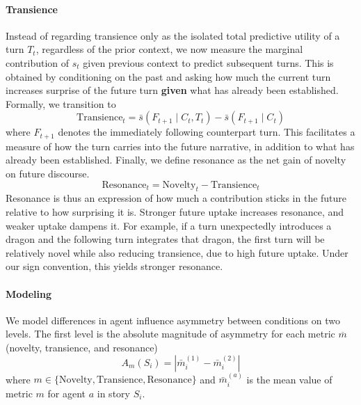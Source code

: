 \documentclass[11pt]{article}
\begin{document}
\paragraph{Transience}
Instead of regarding transience only as the isolated total predictive utility of a turn $T_t$, regardless of the prior context, we now measure the marginal contribution of $s_t$ given previous context to predict subsequent turns. This is obtained by conditioning on the past and asking how much the current turn increases surprise of the future turn \textbf{given} what has already been established. Formally, we transition to
\begin{equation}
\mathrm{Transience}_t
=
\bar{s}(F_{t+1} \mid C_t, T_t)
-
\bar{s}(F_{t+1} \mid C_t)
\end{equation}
where $F_{t+1}$ denotes the immediately following counterpart turn. This facilitates a measure of how the turn carries into the future narrative, in addition to what has already been established. 
Finally, we define resonance as the net gain of novelty on future discourse.
\begin{equation}
\mathrm{Resonance}_t = \mathrm{Novelty}_t - \mathrm{Transience}_t
\end{equation}
Resonance is thus an expression of how much a contribution sticks in the future relative to how surprising it is. Stronger future uptake increases resonance, and weaker uptake dampens it.
For example, if a turn unexpectedly introduces a dragon and the following turn integrates that dragon, the first turn will be relatively novel while also reducing transience, due to high future uptake. Under our sign convention, this yields stronger resonance.

\paragraph{Modeling}
We model differences in agent influence asymmetry between conditions on two levels. The first level is the absolute magnitude of asymmetry for each metric $\overline{m}$ (novelty, transience, and resonance)
\begin{equation}
    A_m(S_i)
    =
    \left|
    \bar{m}^{(1)}_i
    -
    \bar{m}^{(2)}_i
    \right|
\end{equation}
where $m \in \{\mathrm{Novelty}, \mathrm{Transience}, \mathrm{Resonance}\}$ and $\bar{m}^{(a)}_i$ is the mean value of metric $m$ for agent $a$ in story $S_i$.
\end{document}
